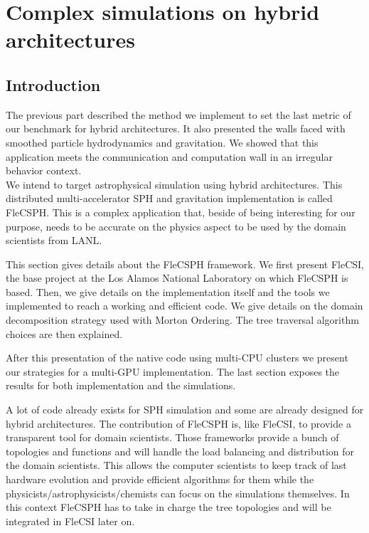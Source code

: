 \chapter{Complex simulations on hybrid architectures}

\section{Introduction}

The previous part described the method we implement to set the last metric of our benchmark for hybrid architectures.
It also presented the walls faced with smoothed particle hydrodynamics and gravitation. 
We showed that this application meets the communication and computation wall in an irregular behavior context.\\

We intend to target astrophysical simulation using hybrid architectures. 
This distributed multi-accelerator SPH and gravitation implementation is called FleCSPH. 
This is a complex application that, beside of being interesting for our purpose, needs to be accurate on the physics aspect to be used by the domain scientists from LANL. 

This section gives details about the FleCSPH framework. 
We first present FleCSI, the base project at the Los Alamos National Laboratory on which FleCSPH is based. 
Then, we give details on the implementation itself and the tools we implemented to reach a working and efficient code. 
We give details on the domain decomposition strategy used with Morton Ordering. 
The tree traversal algorithm choices are then explained. 

After this presentation of the native code using multi-CPU clusters we present our strategies for a multi-GPU implementation. 
The last section exposes the results for both implementation and the simulations. 

A lot of code already exists for SPH simulation and some are already designed for hybrid architectures.
The contribution of FleCSPH is, like FleCSI, to provide a transparent tool for domain scientists. 
Those frameworks provide a bunch of topologies and functions and will handle the load balancing and distribution for the domain scientists. 
This allows the computer scientists to keep track of last hardware evolution and provide efficient algorithms for them while the physicists/astrophysicists/chemists can focus on the simulations themselves. 
In this context FleCSPH has to take in charge the tree topologies and will be integrated in FleCSI later on. 

